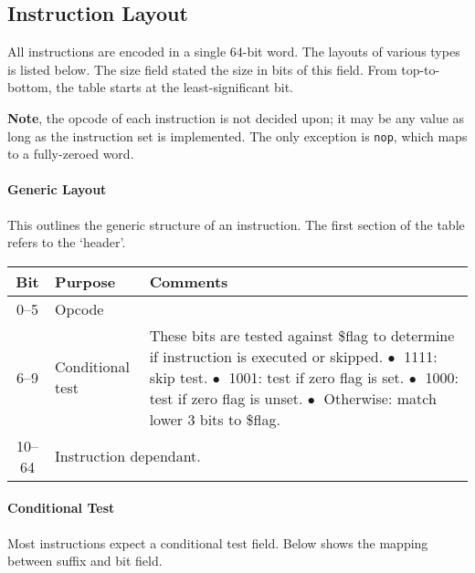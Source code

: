 \documentclass[10pt]{article}
\begin{document}
    \subsection{Instruction Layout}\label{subsec:instruction-layout}

    All instructions are encoded in a single 64-bit word.
    The layouts of various types is listed below.
    The size field stated the size in bits of this field.
    From top-to-bottom, the table starts at the least-significant bit.

    \textbf{Note}, the opcode of each instruction is not decided upon; it may be any value as long as the instruction set is implemented.
    The only exception is \texttt{nop}, which maps to a fully-zeroed word.

    \paragraph{Generic Layout}
    This outlines the generic structure of an instruction.
    The first section of the table refers to the `header'.

    \bigskip
    \begin{tabular}{|c|l|l|}
        \hline
        \textbf{Bit} & \textbf{Purpose} & \textbf{Comments} \\
        \hline
        0--5 & Opcode & \\
        \hline
        6--9 & Conditional test & \makecell[l]{These bits are tested against \$flag to determine if instruction is executed or skipped.\\%
        \(\bullet\;\) 1111: skip test.\\%
        \(\bullet\;\) 1001: test if zero flag is set.\\%
        \(\bullet\;\) 1000: test if zero flag is unset.\\%
        \(\bullet\;\) Otherwise: match lower 3 bits to \$flag.} \\
        \hline
        \hline
        10--64 & \multicolumn{2}{l|}{Instruction dependant.} \\
        \hline
    \end{tabular}

    \paragraph{Conditional Test}
    Most instructions expect a conditional test field.
    Below shows the mapping between suffix and bit field.
\end{document}
